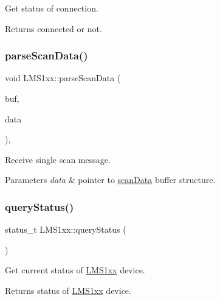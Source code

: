 Get status of connection. 

\begin{DoxyReturn}{Returns}
connected or not. 
\end{DoxyReturn}
\mbox{\label{classLMS1xx_af464cc59dd48de8497e9d52599b5c292}} 
\subsubsection{\texorpdfstring{parse\+Scan\+Data()}{parseScanData()}}
{\footnotesize\ttfamily void L\+M\+S1xx\+::parse\+Scan\+Data (\begin{DoxyParamCaption}\item[{char $\ast$}]{buf,  }\item[{\hyperlink{structscanData}{scan\+Data} $\ast$}]{data }\end{DoxyParamCaption})\hspace{0.3cm}{\ttfamily [static]}, {\ttfamily [protected]}}



Receive single scan message. 


\begin{DoxyParams}{Parameters}
{\em data} & pointer to \hyperlink{structscanData}{scan\+Data} buffer structure. \\
\hline
\end{DoxyParams}
\mbox{\label{classLMS1xx_a6edfc1caa0a9788375ca6d9e6025dc2f}} 
\subsubsection{\texorpdfstring{query\+Status()}{queryStatus()}}
{\footnotesize\ttfamily status\+\_\+t L\+M\+S1xx\+::query\+Status (\begin{DoxyParamCaption}{ }\end{DoxyParamCaption})}



Get current status of \hyperlink{classLMS1xx}{L\+M\+S1xx} device. 

\begin{DoxyReturn}{Returns}
status of \hyperlink{classLMS1xx}{L\+M\+S1xx} device. 
\end{DoxyReturn}
\mbox{\label{classLMS1xx_a0cb0158a78d64667e31c5216871cd656}} 
